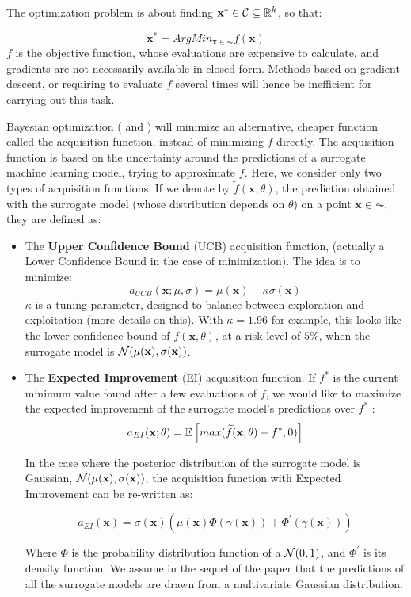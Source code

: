 The optimization problem is about finding $\textbf{x}^* \in \mathcal{C} \subseteq \mathbb{R}^k$, so that: 

$$
\textbf{x}^* = ArgMin_{\textbf{x} \in \AC} f(\textbf{x})
$$
$f$ is the objective function, whose evaluations are expensive to calculate, and gradients are not necessarily available in closed-form. Methods based on gradient descent, or requiring to evaluate $f$ several times will hence be inefficient for carrying out this task. 

\medskip

Bayesian optimization (\cite{mockus1978toward} and \cite{jones2001taxonomy}) will minimize an alternative, cheaper function called the acquisition function, instead of minimizing $f$ directly. The acquisition function is based on the uncertainty around the predictions of a surrogate machine learning model, trying to approximate $f$. Here, we consider only two types of acquisition functions. If we denote by $\widetilde{f}(\textbf{x}, \theta)$, the prediction obtained with the surrogate model (whose distribution depends on $\theta$) on a point $\textbf{x} \in \AC$, they are defined as: 

\begin{itemize}
\item The \textbf{Upper Confidence Bound} (UCB) acquisition function, (actually a Lower Confidence Bound in the case of minimization). The idea is to minimize: 
$$
a_{UCB}(\textbf{x}; \mu, \sigma) = \mu(\textbf{x}) - \kappa \sigma(\textbf{x})
$$
$\kappa$ is a tuning parameter, designed to balance between exploration and exploitation (more details on this). With $\kappa = 1.96$ for example, this looks like the lower confidence bound of $\widetilde{f}(\textbf{x}, \theta)$, at a risk level of $5$\%, when the surrogate model is $\mathcal{N}(\mu(\textbf{x}), \sigma(\textbf{x}))$. 

\medskip

\item The \textbf{Expected Improvement} (EI) acquisition function. If $f^*$ is the current minimum value found after a few evaluations of $f$, we would like to maximize the expected improvement of the surrogate model's predictions over $f^*$ :  
$$
a_{EI}(\textbf{x}; \theta) = \mathbb{E} \left[ max(\widetilde{f}(\textbf{x}, \theta) - f^*, 0)\right]
$$

In the case where the posterior distribution of the surrogate model is Gaussian, $\mathcal{N}(\mu(\textbf{x}), \sigma(\textbf{x}))$, the acquisition function with  Expected Improvement can be re-written as: 

$$
a_{EI}(\textbf{x}) = \sigma(\textbf{x}) \left( \mu(\textbf{x}) \Phi \left( \gamma(\textbf{x}) \right) +  \Phi^{'} \left( \gamma(\textbf{x}) \right) \right)
$$

\medskip

Where $\Phi$ is the probability distribution function of a $\mathcal{N}(0, 1)$, and $\Phi^{'}$ is its density function. We assume in the sequel of the paper that the  predictions of all the surrogate models are drawn from a multivariate Gaussian distribution.

\end{itemize}

